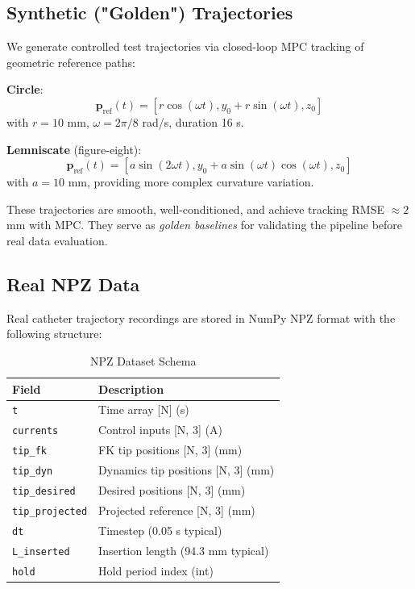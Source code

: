 \documentclass[conference]{IEEEtran}
\begin{document}
\subsection{Synthetic ("Golden") Trajectories}

We generate controlled test trajectories via closed-loop MPC tracking of geometric reference paths:

\textbf{Circle}:
\begin{equation}
\mathbf{p}_{\text{ref}}(t) = [r \cos(\omega t), y_0 + r \sin(\omega t), z_0]
\end{equation}
with $r = 10$ mm, $\omega = 2\pi / 8$ rad/s, duration 16 s.

\textbf{Lemniscate} (figure-eight):
\begin{equation}
\mathbf{p}_{\text{ref}}(t) = [a \sin(2\omega t), y_0 + a \sin(\omega t) \cos(\omega t), z_0]
\end{equation}
with $a = 10$ mm, providing more complex curvature variation.

These trajectories are smooth, well-conditioned, and achieve tracking RMSE $\approx 2$ mm with MPC. They serve as \emph{golden baselines} for validating the pipeline before real data evaluation.

\subsection{Real NPZ Data}

Real catheter trajectory recordings are stored in NumPy NPZ format with the following structure:

\begin{table}[h]
\centering
\caption{NPZ Dataset Schema}
\begin{tabular}{ll}
\toprule
Field & Description \\
\midrule
\texttt{t} & Time array [N] (s) \\
\texttt{currents} & Control inputs [N, 3] (A) \\
\texttt{tip\_fk} & FK tip positions [N, 3] (mm) \\
\texttt{tip\_dyn} & Dynamics tip positions [N, 3] (mm) \\
\texttt{tip\_desired} & Desired positions [N, 3] (mm) \\
\texttt{tip\_projected} & Projected reference [N, 3] (mm) \\
\texttt{dt} & Timestep (0.05 s typical) \\
\texttt{L\_inserted} & Insertion length (94.3 mm typical) \\
\texttt{hold} & Hold period index (int) \\
\bottomrule
\end{tabular}
\end{table}
\end{document}
